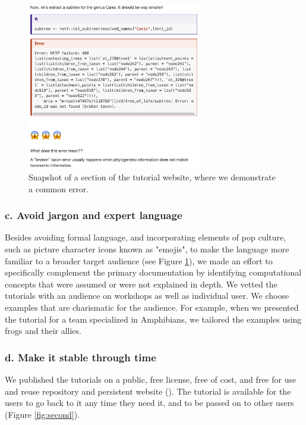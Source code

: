 \documentclass[12pt]{article}
\begin{document}
\begin{figure}
\begin{center}
\includegraphics[width=3in]{fig1.png}
\end{center}
\caption{Snapshot of a section of the tutorial website, where we demonstrate a common error. \label{fig:first}}
\end{figure}

\subsubsection*{c. Avoid jargon and expert language}

Besides avoiding formal language, and incorporating elements of pop culture, such as picture
character icons known as "emojis", to make the language more familiar to a
broader target audience (see Figure \ref{fig:first}), we made an effort to specifically
complement the primary documentation by identifying
computational concepts that were assumed or were not explained in depth.
We vetted the tutorials with an audience on workshops as well as individual user.
We choose examples that are charismatic for the audience.
For example, when we presented the tutorial for a team specialized in Amphibians,
we tailored the examples using frogs and their allies.


\subsubsection*{d. Make it stable through time}

We published the tutorials on a public, free license, free of cost, and free for
use and reuse repository and persistent website (\cite{RopentreeTutorials, RopentreeTutorialsWebsite}).
The tutorial is available for the users to go back to it any time they need it,
and to be passed on to other users (Figure \ref{fig:second}).
\end{document}
